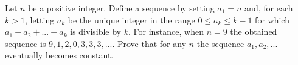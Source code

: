Let $n$ be a positive integer. Define a sequence by setting $a_{1}= n$ and, for each $k > 1$,  letting $a_{k}$ be the unique integer in the range $0\leq a_{k}\leq k-1$ for which $a_{1}+a_{2}+...+a_{k}$ is divisible by $k$. For instance, when $n = 9$ the obtained sequence is $9,1,2,0,3,3,3,...$. Prove that for any $n$ the sequence $a_{1},a_{2},...$ eventually becomes constant.